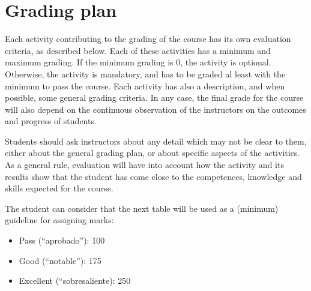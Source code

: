 \documentclass[a4paper]{article}
\begin{document}
\section{Grading plan}

Each activity contributing to the grading of the course has its own evaluation criteria, as described below. Each of these activities has a minimum and maximum grading. If the minimum grading is 0, the activity is optional. Otherwise, the activity is mandatory, and has to be graded al least with the minimum to pass the course. Each activity has also a description, and when possible, some general grading criteria. In any case, the final grade for the course will also depend on the continuous observation of the instructors on the outcomes and progress of students.

Students should ask instructors about any detail which may not be clear to them, either about the general grading plan, or about specific aspects of the activities. As a general rule, evaluation will have into account how the activity and its results show that the student has come close to the competences, knowledge and skills expected for the course.

The student can consider that the next table will be used as a (minimum) guideline for assigning marks:

\begin{itemize}
  \item Pass (``aprobado''): 100
  \item Good (``notable''): 175
   \item Excellent (``sobresaliente): 250
\end{itemize}
\end{document}
